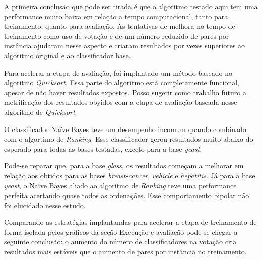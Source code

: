A primeira conclusão que pode ser tirada é que o algoritmo testado aqui tem uma performance muito baixa em relação a tempo computacional, tanto para treinamento, quanto para avaliação. As tentativas de melhora no tempo de treinamento como uso de votação e de um número reduzido de pares por instância ajudaram nesse aspecto e criaram resultados por vezes superiores ao algoritmo original e ao classificador base.

Para acelerar a etapa de avaliação, foi implantado um método baseado no algoritmo \emph{Quicksort}. Essa parte do algoritmo está completamente funcional, apesar de não haver resultados expostos. Posso sugerir como trabalho futuro a metrificação dos resultados obyidos com a etapa de avaliação baseada nesse algoritmo de \emph{Quicksort}.

O classificador Naïve Bayes teve um desempenho incomum quando combinado com o algortimo de \emph{Ranking}. Esse classificador gerou resultados muito abaixo do esperado para todas as bases testadas, exceto para a base \emph{yeast}.

Pode-se reparar que, para a base \emph{glass}, os resultados começam a melhorar em relação aos obtidos para as bases \emph{breast-cancer}, \emph{vehicle} e \emph{hepatitis}. Já para a base \emph{yeast}, o Naïve Bayes aliado ao algoritmo de \emph{Ranking} teve uma performance perfeita acertando quase todos as ordenações. Esse comportamento bipolar não foi elucidado nesse estudo.

Comparando as estratégias implantandas para acelerar a etapa de treinamento de forma isolada pelos gráficos da seção {{Execução e avaliação}} pode-se chegar a seguinte conclusão: o aumento do número de classificadores na votação cria resultados mais estáveis que o aumento de pares por instância no treinamento.
